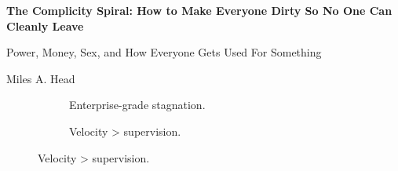 \documentclass{article}
\begin{document}
  \onehalfspacing
  \setlength{\parskip}{1.5em} 



  \begin{titlepage}
    \centering
  
    {\LARGE\bfseries The Complicity Spiral: How to Make Everyone Dirty So No One Can Cleanly Leave \par}
    \vspace{1em}
    {\large Power, Money, Sex, and How Everyone Gets Used For Something \par}
    {\small Miles A. Head \par}
    
  
    \vfill
  
    \begin{figure}[H]
      \centering
      
      \begin{subfigure}[t]{0.45\textwidth}
      \centering
      \caption*{Enterprise-grade stagnation.}
      \end{subfigure}
      \hfill
      \begin{subfigure}[t]{0.45\textwidth}
      \centering
      \caption*{Velocity > supervision.}
      \end{subfigure}
      
      \vspace{1em}
      

\end{figure}
\end{titlepage}
\end{document}
